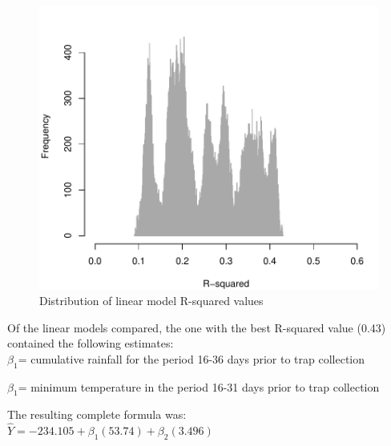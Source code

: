 \documentclass{article}
\begin{document}
\begin{multicols}{2}
\begin{figure}[H]
\begin{center}  
\includegraphics{mosquitoRainTempArticle-005}
\caption{Distribution of linear model R-squared values}
\end{center}
\end{figure}



Of the linear models compared, the one with the best R-squared value (0.43) contained the following estimates:\\

$\beta_1$= cumulative rainfall for the period 16-36 days prior to trap collection 

$\beta_1$= minimum temperature in the period 16-31 days prior to trap collection 

The resulting complete formula was: \\

$\hat{Y}= -234.105 + \beta_1(53.74) + \beta_2(3.496) $ \\



\end{multicols}
\end{document}
